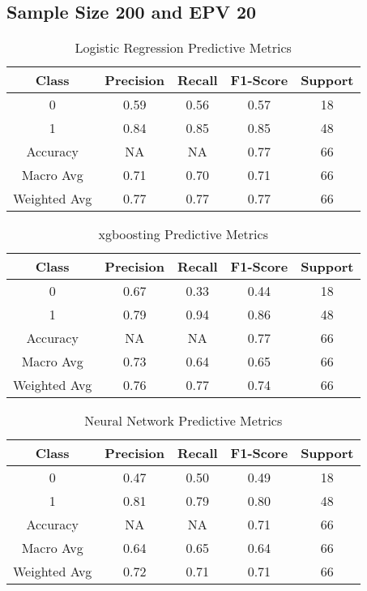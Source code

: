 \documentclass[
  man]{apa7}
\begin{document}
\hypertarget{sample-size-200-and-epv-20}{%
\subsection{Sample Size 200 and EPV 20}\label{sample-size-200-and-epv-20}}

\begin{table}
\centering
\caption{\label{tab:logitable200}Logistic Regression Predictive Metrics}
\centering
\fontsize{12}{14}\selectfont
\begin{tabular}[t]{c|c|c|c|c}
\hline
Class & Precision & Recall & F1-Score & Support\\
\hline
0 & 0.59 & 0.56 & 0.57 & 18\\
\hline
1 & 0.84 & 0.85 & 0.85 & 48\\
\hline
Accuracy & NA & NA & 0.77 & 66\\
\hline
Macro Avg & 0.71 & 0.70 & 0.71 & 66\\
\hline
Weighted Avg & 0.77 & 0.77 & 0.77 & 66\\
\hline
\end{tabular}
\end{table}

\begin{table}
\centering
\caption{\label{tab:xgbtable200}xgboosting Predictive Metrics}
\centering
\fontsize{12}{14}\selectfont
\begin{tabular}[t]{c|c|c|c|c}
\hline
Class & Precision & Recall & F1-Score & Support\\
\hline
0 & 0.67 & 0.33 & 0.44 & 18\\
\hline
1 & 0.79 & 0.94 & 0.86 & 48\\
\hline
Accuracy & NA & NA & 0.77 & 66\\
\hline
Macro Avg & 0.73 & 0.64 & 0.65 & 66\\
\hline
Weighted Avg & 0.76 & 0.77 & 0.74 & 66\\
\hline
\end{tabular}
\end{table}

\begin{table}
\centering
\caption{\label{tab:nn200}Neural Network Predictive Metrics}
\centering
\fontsize{12}{14}\selectfont
\begin{tabular}[t]{c|c|c|c|c}
\hline
Class & Precision & Recall & F1-Score & Support\\
\hline
0 & 0.47 & 0.50 & 0.49 & 18\\
\hline
1 & 0.81 & 0.79 & 0.80 & 48\\
\hline
Accuracy & NA & NA & 0.71 & 66\\
\hline
Macro Avg & 0.64 & 0.65 & 0.64 & 66\\
\hline
Weighted Avg & 0.72 & 0.71 & 0.71 & 66\\
\hline
\end{tabular}
\end{table}
\end{document}
